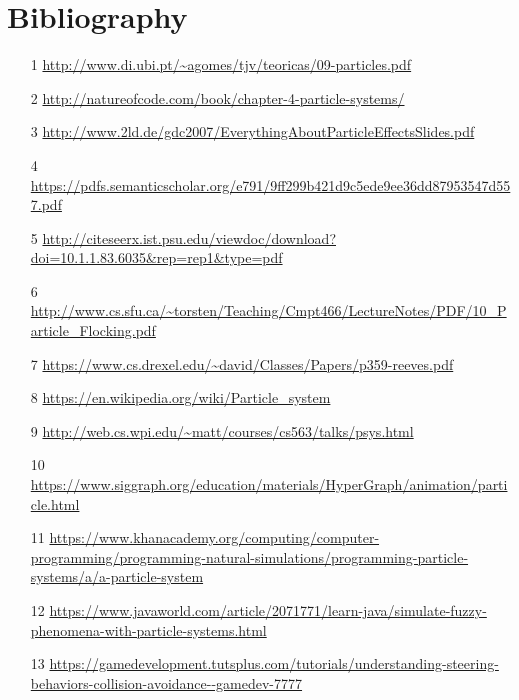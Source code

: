\section{Bibliography}
\begin{itemize}
	\item[1]\url{http://www.di.ubi.pt/~agomes/tjv/teoricas/09-particles.pdf}
	\item[2]\url{http://natureofcode.com/book/chapter-4-particle-systems/}
	\item[3]\url{http://www.2ld.de/gdc2007/EverythingAboutParticleEffectsSlides.pdf}
	\item[4]\url{https://pdfs.semanticscholar.org/e791/9ff299b421d9c5ede9ee36dd87953547d557.pdf}
	\item[5]\url{http://citeseerx.ist.psu.edu/viewdoc/download?doi=10.1.1.83.6035&rep=rep1&type=pdf}
	\item[6]\url{http://www.cs.sfu.ca/~torsten/Teaching/Cmpt466/LectureNotes/PDF/10_Particle_Flocking.pdf}
	\item[7]\url{https://www.cs.drexel.edu/~david/Classes/Papers/p359-reeves.pdf}
	\item[8]\url{https://en.wikipedia.org/wiki/Particle_system}
	\item[9]\url{http://web.cs.wpi.edu/~matt/courses/cs563/talks/psys.html}
	\item[10]\url{https://www.siggraph.org/education/materials/HyperGraph/animation/particle.html}
	\item[11]\url{https://www.khanacademy.org/computing/computer-programming/programming-natural-simulations/programming-particle-systems/a/a-particle-system}
	\item[12]\url{https://www.javaworld.com/article/2071771/learn-java/simulate-fuzzy-phenomena-with-particle-systems.html}
	\item[13]\url{https://gamedevelopment.tutsplus.com/tutorials/understanding-steering-behaviors-collision-avoidance--gamedev-7777}
\end{itemize}
